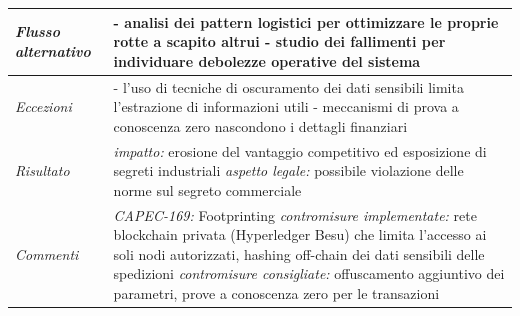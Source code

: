 \begin{longtable}{| >{\columncolor{abuseCol}}p{} | p{} |}
\hline
\textit{Flusso alternativo} & - analisi dei pattern logistici per ottimizzare le proprie rotte a scapito altrui \newline - studio dei fallimenti per individuare debolezze operative del sistema \\
\hline
\textit{Eccezioni} & - l'uso di tecniche di oscuramento dei dati sensibili limita l'estrazione di informazioni utili \newline - meccanismi di prova a conoscenza zero nascondono i dettagli finanziari \\
\hline
\textit{Risultato} & \textit{impatto:} erosione del vantaggio competitivo ed esposizione di segreti industriali \newline \textit{aspetto legale:} possibile violazione delle norme sul segreto commerciale \\
\hline
\textit{Commenti} & \textit{CAPEC-169:} Footprinting \newline \textit{contromisure implementate:} rete blockchain privata (Hyperledger Besu) che limita l'accesso ai soli nodi autorizzati, hashing off-chain dei dati sensibili delle spedizioni \newline \textit{contromisure consigliate:} offuscamento aggiuntivo dei parametri, prove a conoscenza zero per le transazioni \\
\hline
\end{longtable}

